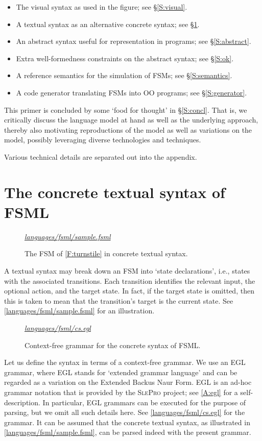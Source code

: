 \documentclass[preprint,authoryear,12pt]{noelsarticle}
\newcommand{\slepro}{\textsc{SlePro}}
\newcommand{\codefigure}[3]{
\begin{figure}[t!]
\begin{boxedminipage}{\hsize}
\mbox{}\hfill{}{\small\textit{\href{http://github.com/slebok/slepro/tree/master/#2}{#2}}}

\end{boxedminipage}
\caption{#1.}
\label{#2}
\medskip
\end{figure}}
\begin{document}
\begin{itemize}
\item The visual syntax as used in the figure; see \S\ref{S:visual}.
\item A textual syntax as an alternative concrete syntax; see \S\ref{S:textual}.
\item An abstract syntax useful for representation in programs; see \S\ref{S:abstract}.
\item Extra well-formedness constraints on the abstract syntax; see \S\ref{S:ok}.
\item A reference semantics for the simulation of FSMs; see \S\ref{S:semantics}.
\item A code generator translating FSMs into OO programs; see \S\ref{S:generator}.
\end{itemize}

This primer is concluded by some `food for thought' in
\S\ref{S:concl}. That is, we critically discuss the language model at
hand as well as the underlying approach, thereby also motivating
reproductions of the model as well as variations on the model,
possibly leveraging diverse technologies and techniques.

Various technical details are separated out into the appendix.


\section{The concrete textual syntax of FSML}
\label{S:textual}

\codefigure{%
The FSM of \autoref{F:turnstile} in concrete textual syntax}{%
languages/fsml/sample.fsml}{%
fsml}

A textual syntax may break down an FSM into `state declarations',
i.e., states with the associated transitions. Each transition
identifies the relevant input, the optional action, and the target
state. In fact, if the target state is omitted, then this is taken to
mean that the transition's target is the current state. See
\autoref{languages/fsml/sample.fsml} for an illustration.

\codefigure{%
Context-free grammar for the concrete syntax of FSML}{%
languages/fsml/cs.egl}{%
egl}

Let us define the syntax in terms of a context-free grammar. We use an
EGL grammar, where EGL stands for `extended grammar language' and can
be regarded as a variation on the Extended Backus Naur Form. EGL is an
ad-hoc grammar notation that is provided by the \slepro{} project; see
\ref{A:egl} for a self-description. In particular, EGL grammars can
be executed for the purpose of parsing, but we omit all such details
here. See \autoref{languages/fsml/cs.egl} for the grammar. It can be
assumed that the concrete textual syntax, as illustrated in
\autoref{languages/fsml/sample.fsml}, can be parsed indeed
with the present grammar.
\end{document}
